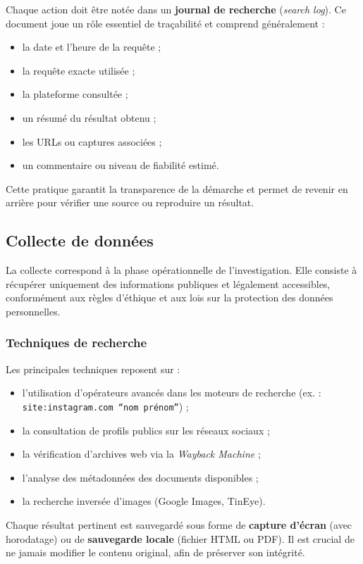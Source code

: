 \documentclass[12pt,a4paper]{report}
\begin{document}
	Chaque action doit être notée dans un \textbf{journal de recherche} (\textit{search log}). Ce document joue un rôle essentiel de traçabilité et comprend généralement :
	\begin{itemize}
		\item la date et l’heure de la requête ;
		\item la requête exacte utilisée ;
		\item la plateforme consultée ;
		\item un résumé du résultat obtenu ;
		\item les URLs ou captures associées ;
		\item un commentaire ou niveau de fiabilité estimé.
	\end{itemize}
	Cette pratique garantit la transparence de la démarche et permet de revenir en arrière pour vérifier une source ou reproduire un résultat.
	
	\subsection{Collecte de données}
	La collecte correspond à la phase opérationnelle de l’investigation. Elle consiste à récupérer uniquement des informations publiques et légalement accessibles, conformément aux règles d’éthique et aux lois sur la protection des données personnelles.
	
	\subsubsection{Techniques de recherche}
	Les principales techniques reposent sur :
	\begin{itemize}
		\item l’utilisation d’opérateurs avancés dans les moteurs de recherche (ex. : \texttt{site:instagram.com ``nom prénom''}) ;
		\item la consultation de profils publics sur les réseaux sociaux ;
		\item la vérification d’archives web via la \textit{Wayback Machine} ;
		\item l’analyse des métadonnées des documents disponibles ;
		\item la recherche inversée d’images (Google Images, TinEye).
	\end{itemize}
	Chaque résultat pertinent est sauvegardé sous forme de \textbf{capture d’écran} (avec horodatage) ou de \textbf{sauvegarde locale} (fichier HTML ou PDF). Il est crucial de ne jamais modifier le contenu original, afin de préserver son intégrité.
	
\end{document}

